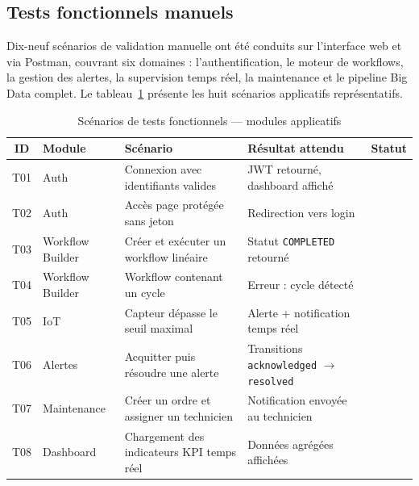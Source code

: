 \subsection{Tests fonctionnels manuels}

Dix-neuf scénarios de validation manuelle ont été conduits sur l'interface web et
via Postman, couvrant six domaines : l'authentification, le moteur de workflows,
la gestion des alertes, la supervision temps réel, la maintenance et le pipeline
Big Data complet. Le tableau~\ref{tab:tests_fonctionnels} présente les huit scénarios
applicatifs représentatifs.

\begin{table}[H]
	\centering
	\renewcommand{\arraystretch}{1.3}
	\caption{Scénarios de tests fonctionnels — modules applicatifs}
	\begin{tabular}{|c|p{2.5cm}|p{5.8cm}|p{3cm}|c|}
		\hline
		\textbf{ID} & \textbf{Module} & \textbf{Scénario} & \textbf{Résultat attendu} & \textbf{Statut} \\
		\hline
		T01 & Auth             & Connexion avec identifiants valides               & JWT retourné, dashboard affiché    & \textbf{\checkmark} \\
		\hline
		T02 & Auth             & Accès page protégée sans jeton                    & Redirection vers login             & \textbf{\checkmark} \\
		\hline
		T03 & Workflow Builder & Créer et exécuter un workflow linéaire            & Statut \texttt{COMPLETED} retourné & \textbf{\checkmark} \\
		\hline
		T04 & Workflow Builder & Workflow contenant un cycle                       & Erreur : cycle détecté             & \textbf{\checkmark} \\
		\hline
		T05 & IoT              & Capteur dépasse le seuil maximal                  & Alerte + notification temps réel   & \textbf{\checkmark} \\
		\hline
		T06 & Alertes          & Acquitter puis résoudre une alerte                & Transitions \texttt{acknowledged} $\to$ \texttt{resolved} & \textbf{\checkmark} \\
		\hline
		T07 & Maintenance      & Créer un ordre et assigner un technicien          & Notification envoyée au technicien & \textbf{\checkmark} \\
		\hline
		T08 & Dashboard        & Chargement des indicateurs KPI temps réel         & Données agrégées affichées         & \textbf{\checkmark} \\
		\hline
	\end{tabular}
	\label{tab:tests_fonctionnels}
\end{table}

